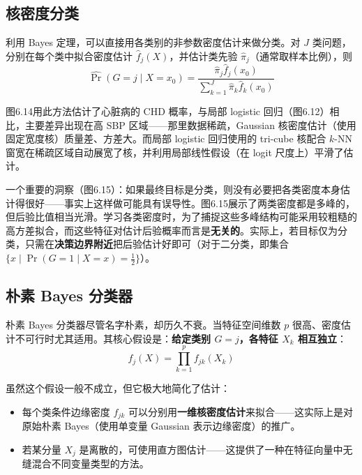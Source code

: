 \subsection{核密度分类}

利用 Bayes 定理，可以直接用各类别的非参数密度估计来做分类。对 $J$ 类问题，分别在每个类中拟合密度估计 $\hat{f}_j(X)$，并估计类先验 $\hat{\pi}_j$（通常取样本比例），则
\begin{equation}\label{eq:bayes_density_classify}
    \widehat{\Pr}(G = j \mid X = x_0) = \frac{\hat{\pi}_j \hat{f}_j(x_0)}{\sum_{k=1}^{J} \hat{\pi}_k \hat{f}_k(x_0)}
\end{equation}

图6.14用此方法估计了心脏病的 CHD 概率，与局部 logistic 回归（图6.12）相比，主要差异出现在高 SBP 区域——那里数据稀疏，Gaussian 核密度估计（使用固定宽度核）质量差、方差大。而局部 logistic 回归使用的 tri-cube 核配合 $k$-NN 窗宽在稀疏区域自动展宽了核，并利用局部线性假设（在 logit 尺度上）平滑了估计。

一个重要的洞察（图6.15）：如果最终目标是分类，则没有必要把各类密度本身估计得很好——事实上这样做可能具有误导性。图6.15展示了两类密度都是多峰的，但后验比值相当光滑。学习各类密度时，为了捕捉这些多峰结构可能采用较粗糙的高方差拟合，而这些特征对估计后验概率而言是\textbf{无关的}。实际上，若目标仅为分类，只需在\textbf{决策边界附近}把后验估计好即可（对于二分类，即集合 $\{x \mid \Pr(G = 1 \mid X = x) = \frac{1}{2}\}$）。

\subsection{朴素 Bayes 分类器}

朴素 Bayes 分类器尽管名字朴素，却历久不衰。当特征空间维数 $p$ 很高、密度估计不可行时尤其适用。其核心假设是：\textbf{给定类别 $G = j$，各特征 $X_k$ 相互独立}：
\begin{equation}\label{eq:naive_bayes}
    f_j(X) = \prod_{k=1}^{p} f_{jk}(X_k)
\end{equation}

虽然这个假设一般不成立，但它极大地简化了估计：
\begin{itemize}
    \item 每个类条件边缘密度 $f_{jk}$ 可以分别用\textbf{一维核密度估计}来拟合——这实际上是对原始朴素 Bayes（使用单变量 Gaussian 表示边缘密度）的推广。
    \item 若某分量 $X_j$ 是离散的，可使用直方图估计——这提供了一种在特征向量中无缝混合不同变量类型的方法。
\end{itemize}

